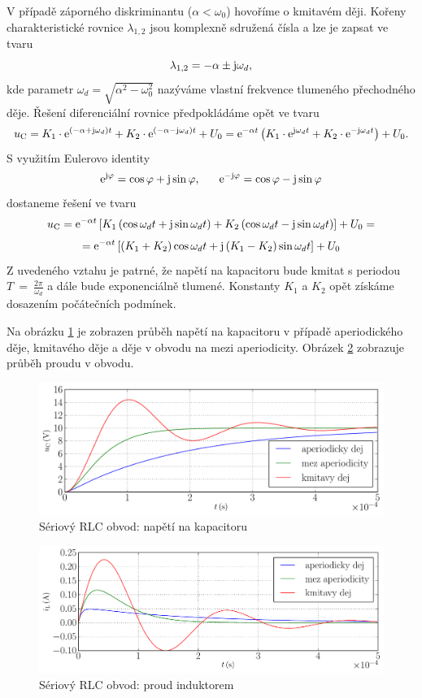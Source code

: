 V případě záporného diskriminantu ($\alpha < \omega_0$) hovoříme o kmitavém ději. Kořeny charakteristické rovnice $\lambda_{1,2}$ jsou komplexně sdružená čísla a lze je zapsat ve tvaru
$$
\lambda_{1,2} = - \alpha \pm \mathrm{j} \omega_d,
$$
kde parametr $\omega_d = \sqrt{\alpha^2 - \omega_0^2}$ nazýváme vlastní frekvence tlumeného přechodného děje. Řešení diferenciální rovnice předpokládáme opět ve tvaru
$$
u_\mathrm{C} = K_1 \cdot \mathrm{e}^{\left( - \alpha + \mathrm{j} \omega_d \right) t} + K_2 \cdot \mathrm{e}^{\left(- \alpha - \mathrm{j} \omega_d \right) t} + U_0 = \mathrm{e}^{- \alpha t} \left( K_1 \cdot \mathrm{e}^{\mathrm{j} \omega_d t} + K_2 \cdot \mathrm{e}^{- \mathrm{j} \omega_d t} \right) + U_0.
$$
S využitím Eulerovo identity
$$
\mathrm{e}^{\mathrm{j} \varphi} = \cos \varphi + \mathrm{j} \sin \varphi,~~~~~
\mathrm{e}^{- \mathrm{j} \varphi} = \cos \varphi - \mathrm{j} \sin \varphi
$$
dostaneme řešení ve tvaru
$$
u_\mathrm{C} = \mathrm{e}^{- \alpha t} \left[ K_1 \left( \cos \omega_d t + \mathrm{j} \sin \omega_d t \right) + K_2 \left( \cos \omega_d t - \mathrm{j} \sin \omega_d t \right) \right] + U_0 =
$$
$$
= \mathrm{e}^{- \alpha t} \left[ \left( K_1 + K_2 \right) \cos \omega_d t + \mathrm{j} \left( K_1 - K_2 \right) \sin \omega_d t \right] + U_0
$$
Z uvedeného vztahu je patrné, že napětí na kapacitoru bude kmitat s periodou $T~=~\frac{2 \pi}{\omega_d}$ a dále bude exponenciálně tlumené. Konstanty $K_1$ a $K_2$ opět získáme dosazením počátečních podmínek.

Na obrázku \ref{fig:obvod_rlc_napeti} je zobrazen průběh napětí na kapacitoru v případě aperiodického děje, kmitavého děje a děje v obvodu na mezi aperiodicity. Obrázek \ref{fig:obvod_rlc_proud} zobrazuje průběh proudu v obvodu.

\begin{figure}[h!]
\centering
\includegraphics[width=13cm]{prechodne_jevy/druhy_rad/obvod_rlc_napeti.pdf}
\caption{Sériový RLC obvod: napětí na kapacitoru}
\label{fig:obvod_rlc_napeti}
\end{figure}

\begin{figure}[h!]
\centering
\includegraphics[width=13cm]{prechodne_jevy/druhy_rad/obvod_rlc_proud.pdf}
\caption{Sériový RLC obvod: proud induktorem}
\label{fig:obvod_rlc_proud}
\end{figure}

